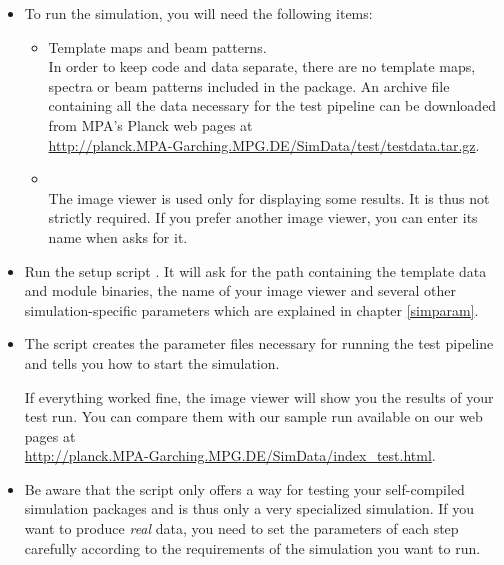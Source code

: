 \documentclass[pdf]{planckDoc}
\begin{document}
\begin{itemize}

\item To run the simulation, you will need the following items:
   \begin{itemize}
   \item Template maps and beam patterns. \\
      In order to keep code and data separate, there are no template maps,
      spectra or beam patterns included in the package.
      An archive file containing all the data necessary for the test
      pipeline can be downloaded from MPA's Planck web pages at\\
      \href{http://planck.MPA-Garching.MPG.DE/SimData/test/testdata.tar.gz}
        {http://planck.MPA-Garching.MPG.DE/SimData/test/testdata.tar.gz}.
   \item {} \\
      The image viewer  is used only for displaying some
      results. It is thus not strictly required.
      If you prefer another image viewer, you can enter its name when
       asks for it.
   \end{itemize}

\item Run the setup script .
It will ask for the path containing the template data and module binaries,
the name of your image viewer and several other simulation-specific
parameters which are explained in chapter \ref{simparam}.

\item The script creates the parameter files necessary for running the test
pipeline and tells you how to start the simulation.

If everything worked fine, the image viewer will show you
the results of your test run. You can compare them with our sample run
available on our web pages at\\
\href{http://planck.MPA-Garching.MPG.DE/SimData/index_test.html}
{http://planck.MPA-Garching.MPG.DE/SimData/index\_test.html}.

\item Be aware that the  script only offers
a way for testing your self-compiled simulation packages and
is thus only a very specialized simulation. If you want to produce
\emph{real} data, you need to set the parameters of each step carefully
according to the requirements of the simulation you want to run.

\end{itemize}
\end{document}
